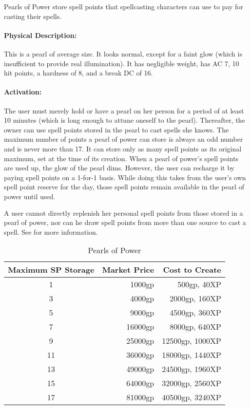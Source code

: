 Pearls of Power store spell points that spellcasting characters can use to pay
for casting their spells.

\paragraph{Physical Description:} This is a pearl of average size.
It looks normal, except for a faint glow (which is insufficient to provide real
illumination). It has negligible weight, has AC 7, 10 hit points, a hardness of
8, and a break DC of 16.

\paragraph{Activation:} The user must merely hold or have a pearl on her person for a
period of at least 10 minutes (which is long enough to attune oneself to the
pearl). Thereafter, the owner can use spell points stored in the pearl to
cast spells she knows.
The maximum number of points a pearl of power can store is always an odd
number and is never more than 17. It can store only as many spell points as its
original maximum, set at the time of its creation. When a pearl of power's
spell points are used up, the glow of the pearl dims. 
However, the user can
recharge it by paying spell points on a 1-for-1 basis. While doing this takes
from the user's own spell point reserve for the day, those spell points remain
available in the pearl of power until used.

A user cannot directly replenish her personal spell points from those stored in
a pearl of power, nor can he draw spell points from more than one source to
cast a spell. See  for more information.

\begin{table*}
\caption{Pearls of Power}
\label{tab:PearlsOfPower}
\centering
\begin{tabular}{crr}
\toprule
\textbf{Maximum SP Storage}&\textbf{Market Price}&\textbf{Cost to Create}\\
\midrule
1&	1000gp	&500gp, 40XP\\
3&	4000gp	&2000gp, 160XP\\
5&	9000gp	&4500gp, 360XP\\
7&	16000gp	&8000gp, 640XP\\
9&	25000gp	&12500gp, 1000XP\\
11&	36000gp	&18000gp, 1440XP\\
13&	49000gp	&24500gp, 1960XP\\
15&	64000gp	&32000gp, 2560XP\\
17&	81000gp	&40500gp, 3240XP\\
\bottomrule
\end{tabular}
\end{table*}

